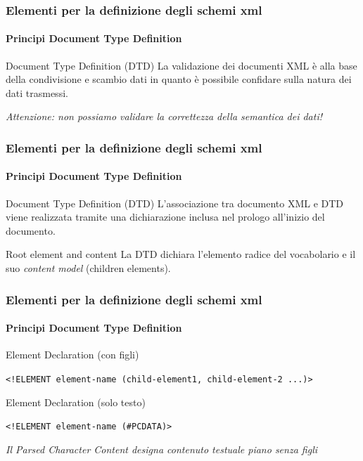 \begin{frame}
    \frametitle{Elementi per la definizione degli schemi xml}
    \framesubtitle{Principi Document Type Definition}
    \addtocounter{nframe}{1}

    \begin{block}{Document Type Definition (DTD)}
        La validazione dei documenti XML è alla base della condivisione e scambio dati in quanto è possibile confidare sulla natura dei dati trasmessi.
    \end{block}
   \textit{Attenzione: non possiamo validare la correttezza della semantica dei dati!}
\end{frame}

\begin{frame}
    \frametitle{Elementi per la definizione degli schemi xml}
    \framesubtitle{Principi Document Type Definition}
    \addtocounter{nframe}{1}

    \begin{block}{Document Type Definition (DTD)}
         L'associazione tra documento XML e DTD viene realizzata tramite una dichiarazione inclusa nel prologo all'inizio del documento.
    \end{block}

    \begin{block}{Root element and content}
        La DTD dichiara l'elemento radice del vocabolario e il suo \textit{content model} (children elements).
    \end{block}
   
\end{frame}

\begin{frame}
    \frametitle{Elementi per la definizione degli schemi xml}
    \framesubtitle{Principi Document Type Definition}
    \addtocounter{nframe}{1}

    \begin{block}{Element Declaration (con figli)}
        \begin{center}\texttt{<!ELEMENT element-name (child-element1, child-element-2 ...)>}\end{center}
    \end{block}

    \begin{block}{Element Declaration (solo testo)}
    \begin{center}\texttt{<!ELEMENT element-name (\#PCDATA)>}\end{center}
    \end{block}
    \textit{Il Parsed Character Content designa contenuto testuale piano senza figli}
\end{frame}


